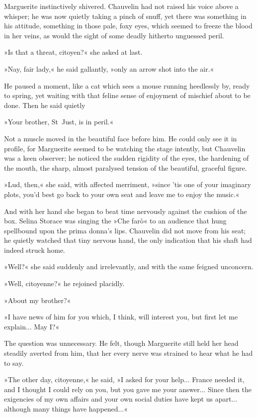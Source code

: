 Marguerite instinctively shivered. Chauvelin had not raised his voice above a whisper; he was now quietly taking a pinch of snuff, yet there was something in his attitude, something in those pale, foxy eyes, which seemed to freeze the blood in her veins, as would the sight of some deadly hitherto unguessed peril.

»Is that a threat, citoyen?« she asked at last.

»Nay, fair lady,« he said gallantly, »only an arrow shot into the air.«

He paused a moment, like a cat which sees a mouse running heedlessly by, ready to spring, yet waiting with that feline sense of enjoyment of mischief about to be done. Then he said quietly\longdash


»Your brother, St~Just, is in peril.«

Not a muscle moved in the beautiful face before him. He could only see it in profile, for Marguerite seemed to be watching the stage intently, but Chauvelin was a keen observer; he noticed the sudden rigidity of the eyes, the hardening of the mouth, the sharp, almost paralysed tension of the beautiful, graceful figure.

»Lud, then,« she said, with affected merriment, »since 'tis one of your imaginary plots, you'd best go back to your own seat and leave me to enjoy the music.«

And with her hand she began to beat time nervously against the cushion of the box. Selina Storace was singing the »Che farò« to an audience that hung spellbound upon the prima donna's lips. Chauvelin did not move from his seat; he quietly watched that tiny nervous hand, the only indication that his shaft had indeed struck home.

»Well?« she said suddenly and irrelevantly, and with the same feigned unconcern.

»Well, citoyenne?« he rejoined placidly.

»About my brother?«

»I have news of him for you which, I think, will interest you, but first let me explain... May I?«

The question was unnecessary. He felt, though Marguerite still held her head steadily averted from him, that her every nerve was strained to hear what he had to say.

»The other day, citoyenne,« he said, »I asked for your help... France needed it, and I thought I could rely on you, but you gave me your answer... Since then the exigencies of my own affairs and your own social duties have kept us apart... although many things have happened...«

